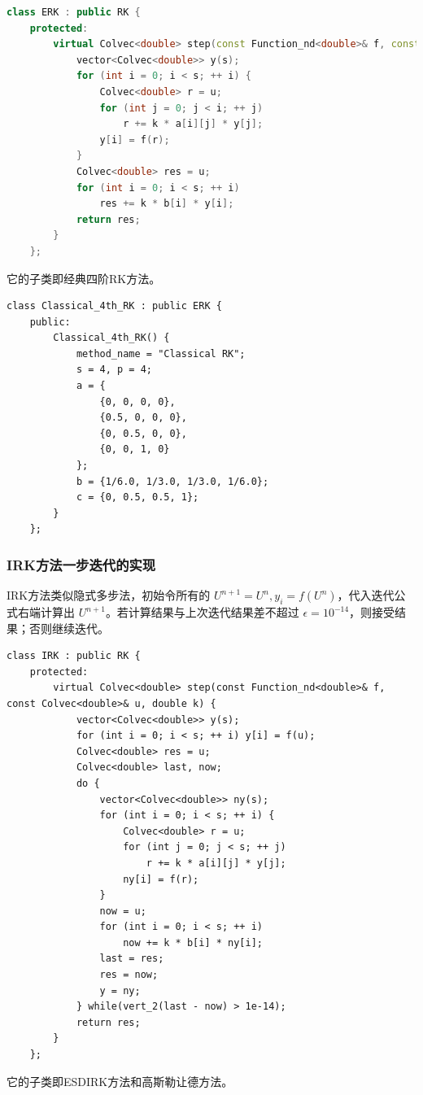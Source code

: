 \documentclass{ctexart}
\begin{document}
\begin{lstlisting}[language=c++]
class ERK : public RK {
	protected:
		virtual Colvec<double> step(const Function_nd<double>& f, const Colvec<double>& u, double k) {
			vector<Colvec<double>> y(s);
			for (int i = 0; i < s; ++ i) {
				Colvec<double> r = u;
				for (int j = 0; j < i; ++ j)
					r += k * a[i][j] * y[j];
				y[i] = f(r);
			}
			Colvec<double> res = u;
			for (int i = 0; i < s; ++ i) 
				res += k * b[i] * y[i];
			return res;
		}
	};
\end{lstlisting}

它的子类即经典四阶RK方法。

\begin{lstlisting}
class Classical_4th_RK : public ERK {
	public:
		Classical_4th_RK() {
			method_name = "Classical RK";
			s = 4, p = 4;
			a = {
				{0, 0, 0, 0},
				{0.5, 0, 0, 0},
				{0, 0.5, 0, 0},
				{0, 0, 1, 0}
			};
			b = {1/6.0, 1/3.0, 1/3.0, 1/6.0};
			c = {0, 0.5, 0.5, 1};
		}
	};
\end{lstlisting}

\subsubsection{IRK方法一步迭代的实现}

IRK方法类似隐式多步法，初始令所有的 $U^{n+1}=U^n,y_i = f(U^n)$，代入迭代公式右端计算出 $U^{n+1}$。若计算结果与上次迭代结果差不超过 $\epsilon=10^{-14}$，则接受结果；否则继续迭代。

\begin{lstlisting}
class IRK : public RK {
	protected:
		virtual Colvec<double> step(const Function_nd<double>& f, const Colvec<double>& u, double k) {
			vector<Colvec<double>> y(s);
			for (int i = 0; i < s; ++ i) y[i] = f(u);
			Colvec<double> res = u;
			Colvec<double> last, now;
			do {
				vector<Colvec<double>> ny(s);
				for (int i = 0; i < s; ++ i) {
					Colvec<double> r = u;
					for (int j = 0; j < s; ++ j)
						r += k * a[i][j] * y[j];
					ny[i] = f(r);
				}
				now = u;
				for (int i = 0; i < s; ++ i)
					now += k * b[i] * ny[i];
				last = res;
				res = now;
				y = ny;
			} while(vert_2(last - now) > 1e-14);
			return res;
		}
	};
\end{lstlisting}

它的子类即ESDIRK方法和高斯勒让德方法。
\end{document}
